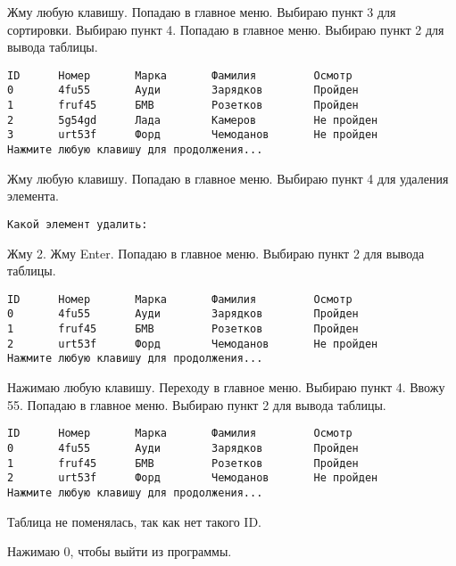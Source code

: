 Жму любую клавишу. Попадаю в главное меню. Выбираю пункт 3 для сортировки. Выбираю пункт 4. Попадаю в главное меню. Выбираю пункт 2 для вывода таблицы.

\begin{tcolorbox}
\begin{verbatim}
ID      Номер       Марка       Фамилия         Осмотр
0       4fu55       Ауди        Зарядков        Пройден   
1       fruf45      БМВ         Розетков        Пройден   
2       5g54gd      Лада        Камеров         Не пройден        
3       urt53f      Форд        Чемоданов       Не пройден
Нажмите любую клавишу для продолжения...
\end{verbatim}
\end{tcolorbox}

Жму любую клавишу. Попадаю в главное меню. Выбираю пункт 4 для удаления элемента.

\begin{tcolorbox}
\begin{verbatim}
Какой элемент удалить:
\end{verbatim}
\end{tcolorbox}

Жму 2. Жму Enter. Попадаю в главное меню. Выбираю пункт 2 для вывода таблицы.

\begin{tcolorbox}
\begin{verbatim}
ID      Номер       Марка       Фамилия         Осмотр
0       4fu55       Ауди        Зарядков        Пройден
1       fruf45      БМВ         Розетков        Пройден
2       urt53f      Форд        Чемоданов       Не пройден
Нажмите любую клавишу для продолжения...
\end{verbatim}
\end{tcolorbox}

Нажимаю любую клавишу. Переходу в главное меню. Выбираю пункт 4. Ввожу 55. Попадаю в главное меню. Выбираю пункт 2 для вывода таблицы.

\begin{tcolorbox}
\begin{verbatim}
ID      Номер       Марка       Фамилия         Осмотр
0       4fu55       Ауди        Зарядков        Пройден
1       fruf45      БМВ         Розетков        Пройден
2       urt53f      Форд        Чемоданов       Не пройден
Нажмите любую клавишу для продолжения...
\end{verbatim}
\end{tcolorbox}

Таблица не поменялась, так как нет такого ID.

Нажимаю 0, чтобы выйти из программы.